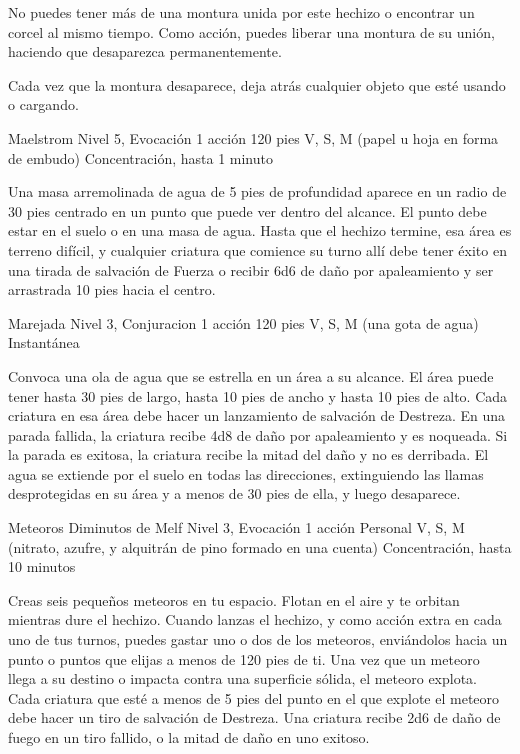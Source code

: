 \documentclass[a4paper,twocolumn,openany,10pt]{dndbook}
\begin{document}
	No puedes tener más de una montura unida por este hechizo o encontrar un corcel al mismo tiempo. Como acción, puedes liberar
	una montura de su unión, haciendo que desaparezca permanentemente.
	
	Cada vez que la montura desaparece, deja atrás cualquier objeto que esté usando o cargando. 

\spellheader%
	{Maelstrom}
	{Nivel 5, Evocación}
	{1 acción}
	{120 pies}
	{V, S, M (papel u hoja en forma de embudo)}
	{Concentración, hasta 1 minuto}
	
	Una masa arremolinada de agua de 5 pies de profundidad aparece en un radio de 30 pies centrado en un punto que puede ver
	dentro del alcance. El punto debe estar en el suelo o en una masa de agua. Hasta que el hechizo termine, esa área es terreno
	difícil, y cualquier criatura que comience su turno allí debe tener éxito en una tirada de salvación de Fuerza o recibir 6d6
	de daño por apaleamiento y ser arrastrada 10 pies hacia el centro. 

\spellheader%
	{Marejada}
	{Nivel 3, Conjuracion}
	{1 acción}
	{120 pies}
	{V, S, M (una gota de agua)}
	{Instantánea}
	
	Convoca una ola de agua que se estrella en un área a su alcance. El área puede tener hasta 30 pies de largo, hasta 10 pies
	de ancho y hasta 10 pies de alto. Cada criatura en esa área debe hacer un lanzamiento de salvación de Destreza. En una
	parada fallida, la criatura recibe 4d8 de daño por apaleamiento y es noqueada. Si la parada es exitosa, la criatura recibe
	la mitad del daño y no es derribada. El agua se extiende por el suelo en todas las direcciones, extinguiendo las llamas
	desprotegidas en su área y a menos de 30 pies de ella, y luego desaparece. 

\spellheader%
	{Meteoros Diminutos de Melf}
	{Nivel 3, Evocación}
	{1 acción}
	{Personal}
	{V, S, M (nitrato, azufre, y alquitrán de pino formado en una cuenta)}
	{Concentración, hasta 10 minutos}
	
	Creas seis pequeños meteoros en tu espacio. Flotan en el aire y te orbitan mientras dure el hechizo. Cuando lanzas el
	hechizo, y como acción extra en cada uno de tus turnos, puedes gastar uno o dos de los meteoros, enviándolos hacia un punto
	o puntos que elijas a menos de 120 pies de ti. Una vez que un meteoro llega a su destino o impacta contra una superficie
	sólida, el meteoro explota. Cada criatura que esté a menos de 5 pies del punto en el que explote el meteoro debe hacer un
	tiro de salvación de Destreza. Una criatura recibe 2d6 de daño de fuego en un tiro fallido, o la mitad de daño en uno
	exitoso.
\end{document}
